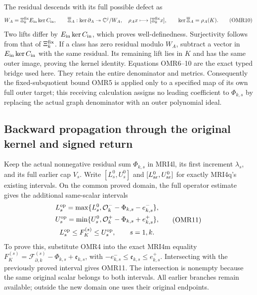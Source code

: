\documentclass[11pt,a4paper]{article}
\begin{document}
The residual descends with its full possible defect as
\[
 W_A=\Xi_k^{\rm fix}E_{\rm in}\ker C_{\rm in},\qquad
 \overline\Xi_A:\ker\partial_A\twoheadrightarrow\mathbb C^j/W_A,
 \quad \rho_Ax\longmapsto[\Xi_k^{\rm fix}x],\qquad
 \ker\overline\Xi_A=\rho_A(K).
 \tag{OMR10}
\]
Two lifts differ by $E_{\rm in}\ker C_{\rm in}$, which proves
well-definedness. Surjectivity follows from that of $\Xi_k^{\rm fix}$.
If a class has zero residual modulo $W_A$, subtract a vector in
$E_{\rm in}\ker C_{\rm in}$ with the same residual. Its remaining
lift lies in $K$ and has the same outer image, proving the kernel
identity. Equations OMR6--10 are the exact typed bridge used here.
They retain the entire denominator and metrics. Consequently the
fixed-subquotient bound OMR5 is applied only to a specified map
of its own full outer target; this receiving calculation assigns
no leading coefficient to $\Phi_{k,s}$ by replacing the actual
graph denominator with an outer polynomial ideal.

\subsection{Backward propagation through the original kernel and signed return}

Keep the actual nonnegative residual sum $\Phi_{k,s}$ in MRI4l,
its first increment $\lambda_s$, and its full earlier cap $V_s$.
Write $[L_s^0,U_s^0]$ and $[L_{\rm ar}^0,U_{\rm ar}^0]$ for
exactly MRI4q's existing intervals. On the common proved domain,
the full operator estimate gives the additional same-scalar intervals
\[
 \begin{gathered}
 L_s^{\rm op}=\max\{L_s^0,
       \mathcal O_k^--\Phi_{k,s}-e_{k,s}^-\},\\
 U_s^{\rm op}=\min\{U_s^0,
       \mathcal O_k^+-\Phi_{k,s}+e_{k,s}^+\},\\
 L_s^{\rm op}\le F_K^{(s)}\le U_s^{\rm op},\qquad s=1,k.
 \end{gathered}\tag{OMR11}
\]
To prove this, substitute OMR4 into the exact MRI4m equality
$F_K^{(s)}=\mathcal F_{\partial,k}^{(s)}-\Phi_{k,s}
+\mathfrak e_{k,s}$, with
$-e_{k,s}^-\le\mathfrak e_{k,s}\le e_{k,s}^+$.
Intersecting with the previously proved interval gives OMR11.
The intersection is nonempty because the same original scalar
belongs to both intervals. All earlier branches remain available;
outside the new domain one uses their original endpoints.
\end{document}
